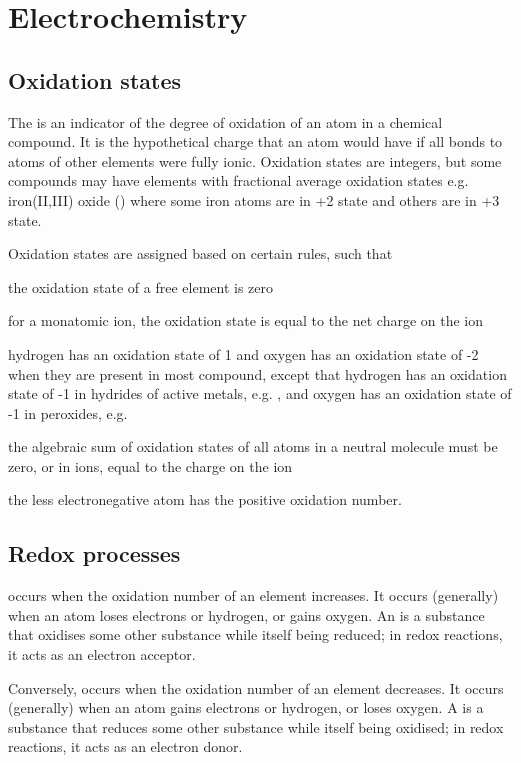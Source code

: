 \documentclass[Chemistry.tex]{subfiles}
\begin{document}
\chapter{Electrochemistry}
\section{Oxidation states}
The  is an indicator of the degree of oxidation of an atom in a chemical compound. It is the hypothetical charge that an atom would have if all bonds to atoms of other elements were fully ionic. Oxidation states are integers, but some compounds may have elements with fractional average oxidation states e.g. iron(II,III) oxide () where some iron atoms are in +2 state and others are in +3 state.

Oxidation states are assigned based on certain rules, such that \begin{slinenum}
\item the oxidation state of a free element is zero
\item for a monatomic ion, the oxidation state is equal to the net charge on the ion
\item hydrogen has an oxidation state of 1 and oxygen has an oxidation state of -2 when they are present in most compound, except that hydrogen has an oxidation state of -1 in hydrides of active metals, e.g. , and oxygen has an oxidation state of -1 in peroxides, e.g. 
\item the algebraic sum of oxidation states of all atoms in a neutral molecule must be zero, or in ions, equal to the charge on the ion
\item the less electronegative atom has the positive oxidation number.
\end{slinenum}
\section{Redox processes}
 occurs when the oxidation number of an element increases. It occurs (generally) when an atom loses electrons or hydrogen, or gains oxygen. An  is a substance that oxidises some other substance while itself being reduced; in redox reactions, it acts as an electron acceptor.

Conversely,  occurs when the oxidation number of an element decreases. It occurs (generally) when an atom gains electrons or hydrogen, or loses oxygen. A  is a substance that reduces some other substance while itself being oxidised; in redox reactions, it acts as an electron donor.
\end{document}
